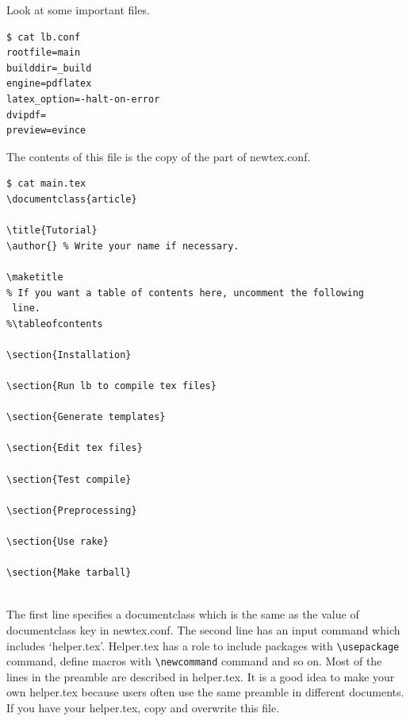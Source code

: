 Look at some important files.
\begin{verbatim}
$ cat lb.conf
rootfile=main
builddir=_build
engine=pdflatex
latex_option=-halt-on-error
dvipdf=
preview=evince
\end{verbatim}
The contents of this file is the copy of the part of newtex.conf.
\begin{verbatim}
$ cat main.tex
\documentclass{article}

\title{Tutorial}
\author{} % Write your name if necessary.

\maketitle
% If you want a table of contents here, uncomment the following
 line.
%\tableofcontents

\section{Installation}
  
\section{Run lb to compile tex files}
  
\section{Generate templates}
  
\section{Edit tex files}
  
\section{Test compile}
  
\section{Preprocessing}
  
\section{Use rake}
  
\section{Make tarball}
  

\end{verbatim}
The first line specifies a documentclass which is the same as the value of documentclass key in newtex.conf.
The second line has an input command which includes `helper.tex'.
Helper.tex has a role to include packages with \verb|\usepackage| command, define macros with \verb|\newcommand| command and so on.
Most of the lines in the preamble are described in helper.tex.
It is a good idea to make your own helper.tex because users often use the same preamble in different documents.
If you have your helper.tex, copy and overwrite this file.

